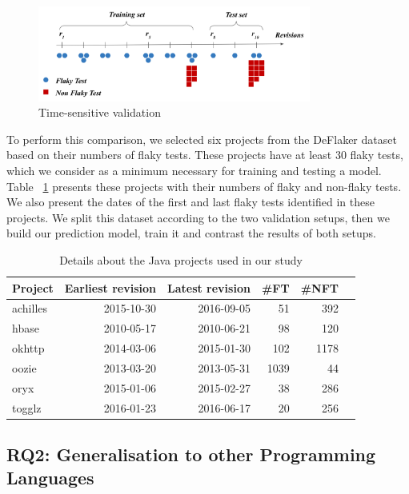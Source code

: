 \begin{figure}
\centering
\includegraphics[width=0.8\textwidth]{figures/replication/fig1.png}
\caption{Time-sensitive validation}
\label{time-validation}
\end{figure}

To perform this comparison, we selected six projects from the DeFlaker dataset based on their numbers of flaky tests. 
These projects have at least 30 flaky tests, which we consider as a minimum necessary for training and testing a model. 
Table ~\ref{javaInfo} presents these projects with their numbers of flaky and non-flaky tests.
We also present the dates of the first and last flaky tests identified in these projects.
We split this dataset according to the two validation setups, then we build our prediction model, train it and contrast the results of both setups.

\begin{table}
\centering
\caption{Details about the Java projects used in our study}
\label{javaInfo}
 \begin{tabular}{l|r r r r r} 
 \toprule
 \textbf{Project} & \textbf{Earliest revision} & \textbf{Latest revision} &\textbf{ \#FT} & \textbf{\#NFT} \\ [0.25ex]
 \midrule
 achilles & 2015-10-30 & 2016-09-05 & 51 & 392 \\
 hbase & 2010-05-17 & 2010-06-21 & 98 & 120\\
 okhttp & 2014-03-06 & 2015-01-30 & 102 & 1178\\
 oozie & 2013-03-20 & 2013-05-31 & 1039 & 44 \\
 oryx & 2015-01-06 & 2015-02-27 & 38 & 286 \\ 
 togglz & 2016-01-23 & 2016-06-17 & 20 & 256 \\ 
 \bottomrule
\end{tabular}
\end{table}



\subsection{RQ2: Generalisation to other Programming Languages}
